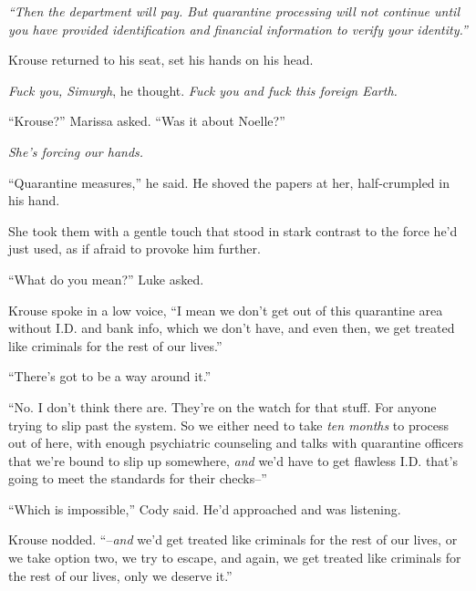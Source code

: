 \emph{``Then the department will pay.  But quarantine processing will not continue until you have provided identification and financial information to verify your identity.''}



Krouse returned to his seat, set his hands on his head.



\emph{Fuck you, Simurgh}, he thought.  \emph{Fuck you and fuck this foreign Earth.}



``Krouse?''  Marissa asked.  ``Was it about Noelle?''



\emph{She's forcing our hands.}



``Quarantine measures,'' he said.  He shoved the papers at her, half-crumpled in his hand.



She took them with a gentle touch that stood in stark contrast to the force he'd just used, as if afraid to provoke him further.



``What do you mean?'' Luke asked.



Krouse spoke in a low voice, ``I mean we don't get out of this quarantine area without I.D. and bank info, which we don't have, and even then, we get treated like criminals for the rest of our lives.''



``There's got to be a way around it.''



``No.  I don't think there are.  They're on the watch for that stuff.  For anyone trying to slip past the system.  So we either need to take \emph{ten months} to process out of here, with enough psychiatric counseling and talks with quarantine officers that we're bound to slip up somewhere, \emph{and} we'd have to get flawless I.D. that's going to meet the standards for their checks--''



``Which is impossible,'' Cody said.  He'd approached and was listening.



Krouse nodded.  ``--\emph{and} we'd get treated like criminals for the rest of our lives, or we take option two, we try to escape, and again, we get treated like criminals for the rest of our lives, only we deserve it.''



